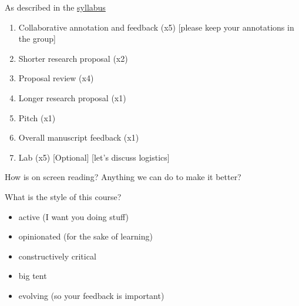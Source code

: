 \documentclass{beamer}
\begin{document}
\begin{frame}

As described in the \textcolor{blue}{\href{http://www.princeton.edu/~mjs3/soc596_f2016/}{syllabus}}

\begin{enumerate}
\item Collaborative annotation and feedback (x5) [please keep your annotations in the group]
\pause
\item Shorter research proposal (x2)
\pause 
\item Proposal review (x4)
\pause
\item Longer research proposal (x1)
\pause
\item Pitch (x1)
\pause
\item Overall manuscript feedback (x1)
\pause
\item Lab (x5) [Optional] [let's discuss logistics]
\end{enumerate}

\end{frame}
\begin{frame}

\begin{center}
\LARGE{How is on screen reading?  Anything we can do to make it better?}
\end{center}

\end{frame}
\begin{frame}

\begin{center}
\LARGE{What is the style of this course?}
\end{center}

\end{frame}
\begin{frame}

\begin{itemize}
\item active (I want you doing stuff)
\pause
\item opinionated (for the sake of learning)
\pause
\item constructively critical
\pause
\item big tent
\pause
\item evolving (so your feedback is important)
\end{itemize}

\end{frame}
\end{document}
